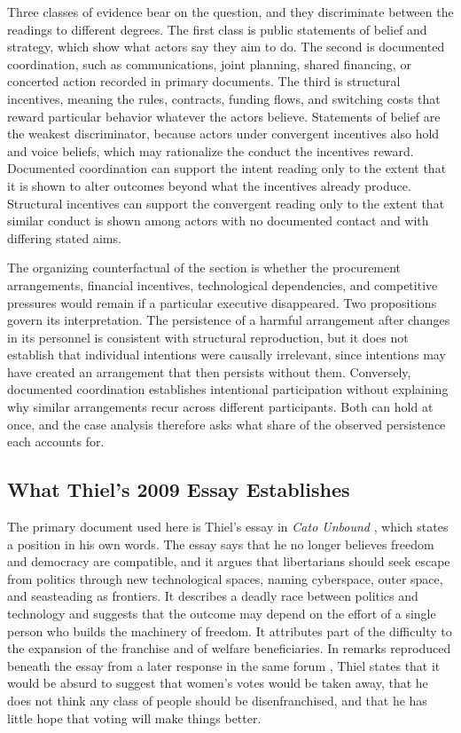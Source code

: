 \documentclass[12pt]{article}
\theoremstyle{remark}
\begin{document}
Three classes of evidence bear on the question, and they discriminate between the readings to different degrees. The first class is public statements of belief and strategy, which show what actors say they aim to do. The second is documented coordination, such as communications, joint planning, shared financing, or concerted action recorded in primary documents. The third is structural incentives, meaning the rules, contracts, funding flows, and switching costs that reward particular behavior whatever the actors believe. Statements of belief are the weakest discriminator, because actors under convergent incentives also hold and voice beliefs, which may rationalize the conduct the incentives reward. Documented coordination can support the intent reading only to the extent that it is shown to alter outcomes beyond what the incentives already produce. Structural incentives can support the convergent reading only to the extent that similar conduct is shown among actors with no documented contact and with differing stated aims.

The organizing counterfactual of the section is whether the procurement arrangements, financial incentives, technological dependencies, and competitive pressures would remain if a particular executive disappeared. Two propositions govern its interpretation. The persistence of a harmful arrangement after changes in its personnel is consistent with structural reproduction, but it does not establish that individual intentions were causally irrelevant, since intentions may have created an arrangement that then persists without them. Conversely, documented coordination establishes intentional participation without explaining why similar arrangements recur across different participants. Both can hold at once, and the case analysis therefore asks what share of the observed persistence each accounts for.

\subsection{What Thiel's 2009 Essay Establishes}

The primary document used here is Thiel's essay in \emph{Cato Unbound} \cite{thiel2009}, which states a position in his own words. The essay says that he no longer believes freedom and democracy are compatible, and it argues that libertarians should seek escape from politics through new technological spaces, naming cyberspace, outer space, and seasteading as frontiers. It describes a deadly race between politics and technology and suggests that the outcome may depend on the effort of a single person who builds the machinery of freedom. It attributes part of the difficulty to the expansion of the franchise and of welfare beneficiaries. In remarks reproduced beneath the essay from a later response in the same forum \cite{thiel2009b}, Thiel states that it would be absurd to suggest that women's votes would be taken away, that he does not think any class of people should be disenfranchised, and that he has little hope that voting will make things better.
\end{document}
